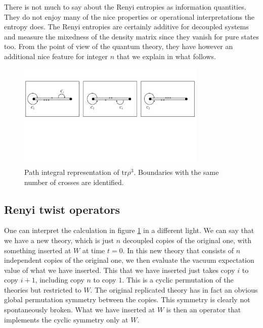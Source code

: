 \documentclass[11pt]{article}
\numberwithin{equation}{section}
\begin{document}
There is not much to say about the Renyi entropies as information quantities. They do not enjoy many of the nice properties or operational interpretations the entropy does. The Renyi entropies are certainly additive for decoupled systems and measure the mixedness of the density matrix since they vanish for pure states too. From the point of view of the quantum theory, they have however an additional nice feature for integer $n$ that we explain in what follows.   

\begin{figure}[t]
\begin{center}  
\includegraphics[width=0.8\textwidth]{replica2.pdf}
\captionsetup{width=0.9\textwidth}
\caption{Path integral representation of $\textrm{tr} \rho^3$. Boundaries with the same number of crosses are identified.}
\label{replica1}
\end{center}  
\end{figure}


\subsection{Renyi twist operators}
One can interpret the calculation in figure \ref{replica1} in a different light. We can say that we have a new theory, which is just $n$ decoupled copies of the original one, with something inserted at $W$ at time $t=0$. In this new theory that consists of $n$ independent copies of the original one, we then evaluate the vacuum expectation value of what we have inserted. This that we have inserted just takes copy $i$ to copy $i+1$, including copy $n$ to copy $1$. This is a cyclic permutation of the theories but restricted to $W$. The original replicated theory has in fact an obvious global permutation symmetry between the copies. This symmetry is clearly not spontaneously broken. What we have inserted at $W$ is then an operator that implements the cyclic symmetry only at $W$. 
\end{document}
